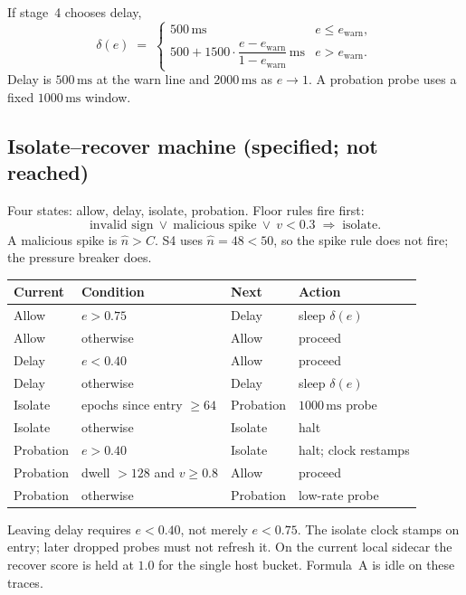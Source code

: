 \documentclass[11pt,a4paper]{article}
\begin{document}
If stage~4 chooses delay,
\begin{equation}
\delta(e) \;=\;
\begin{cases}
500\,\mathrm{ms} & e \le e_{\mathrm{warn}},\\[4pt]
500 + 1500\cdot\dfrac{e-e_{\mathrm{warn}}}{1-e_{\mathrm{warn}}}\,\mathrm{ms} & e > e_{\mathrm{warn}}.
\end{cases}
\end{equation}
Delay is $500\,\mathrm{ms}$ at the warn line and $2000\,\mathrm{ms}$ as $e\to 1$.
A probation probe uses a fixed $1000\,\mathrm{ms}$ window.

\subsection{Isolate--recover machine (specified; not reached)}

Four states: allow, delay, isolate, probation.
Floor rules fire first:
\[
\text{invalid sign}\ \lor\ \text{malicious spike}\ \lor\ v<0.3 \;\Rightarrow\; \mathrm{isolate}.
\]
A malicious spike is $\hat n>C$.
S4 uses $\hat n=48<50$, so the spike rule does not fire; the pressure breaker does.

\begin{center}
\small
\begin{tabular}{@{}llll@{}}
\toprule
Current & Condition & Next & Action \\
\midrule
Allow & $e>0.75$ & Delay & sleep $\delta(e)$ \\
Allow & otherwise & Allow & proceed \\
Delay & $e<0.40$ & Allow & proceed \\
Delay & otherwise & Delay & sleep $\delta(e)$ \\
Isolate & epochs since entry $\ge 64$ & Probation & $1000\,\mathrm{ms}$ probe \\
Isolate & otherwise & Isolate & halt \\
Probation & $e>0.40$ & Isolate & halt; clock restamps \\
Probation & dwell $>128$ and $v\ge 0.8$ & Allow & proceed \\
Probation & otherwise & Probation & low-rate probe \\
\bottomrule
\end{tabular}
\end{center}

Leaving delay requires $e<0.40$, not merely $e<0.75$.
The isolate clock stamps on entry; later dropped probes must not refresh it.
On the current local sidecar the recover score is held at $1.0$ for the single host bucket.
Formula~A is idle on these traces.
\end{document}
